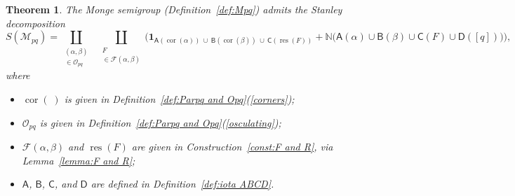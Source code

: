 \documentclass[noamsfonts,10pt]{amsart}
\newcommand{\N}{\mathbb{N}}
\newcommand{\M}{\mathcal{M}}
\newcommand{\al}{\alpha}
\newcommand{\be}{\beta}
\renewcommand{\O}{\mathcal{O}}
\newcommand{\F}{\mathcal{F}}
\newcommand{\res}{\operatorname{res}}
\DeclareMathOperator{\cor}{cor}
\newcommand{\sA}{\mathsf{A}}
\newcommand{\sB}{\mathsf{B}}
\newcommand{\sC}{\mathsf{C}}
\newcommand{\sD}{\mathsf{D}}
\newcommand{\1}{\mathbf{1}}
\theoremstyle{plain}
\newtheorem{theorem}{Theorem}[section]
\theoremstyle{definition}
\numberwithin{equation}{section}
\begin{document}
\begin{theorem}
    \label{thm:Stanley decomp}
    The Monge semigroup (Definition~\ref{def:Mpq}) admits the Stanley decomposition
        \[
            S(\M_{pq}) = \coprod_{\substack{(\al, \be) \\ \in \O_{pq}}} \;\; \coprod_{\substack{F \\ \in \F(\al,\be)}} \Bigg( \1_{\sA(\cor(\al)) \: \cup \: \sB(\cor(\be)) \: \cup \: \sC(\res(F))} + \N \Big( \sA(\al) \cup \sB(\be) \cup \sC(F) \cup \sD([q]) \Big) \Bigg),
        \]
     where
     \begin{itemize}
         \item[] $\cor( \; )$ is given in Definition~\ref{def:Parpq and Opq}(\ref{corners});
         \item[] $\O_{pq}$ is given in Definition~\ref{def:Parpq and Opq}(\ref{osculating});
         \item[] $\F(\al,\be)$ and $\res(F)$ are given in Construction~\ref{const:F and R}, via Lemma~\ref{lemma:F and R};
         \item[] $\sA$, $\sB$, $\sC$, and $\sD$ are defined in Definition~\ref{def:iota ABCD}.
     \end{itemize}
\end{theorem}
\end{document}
